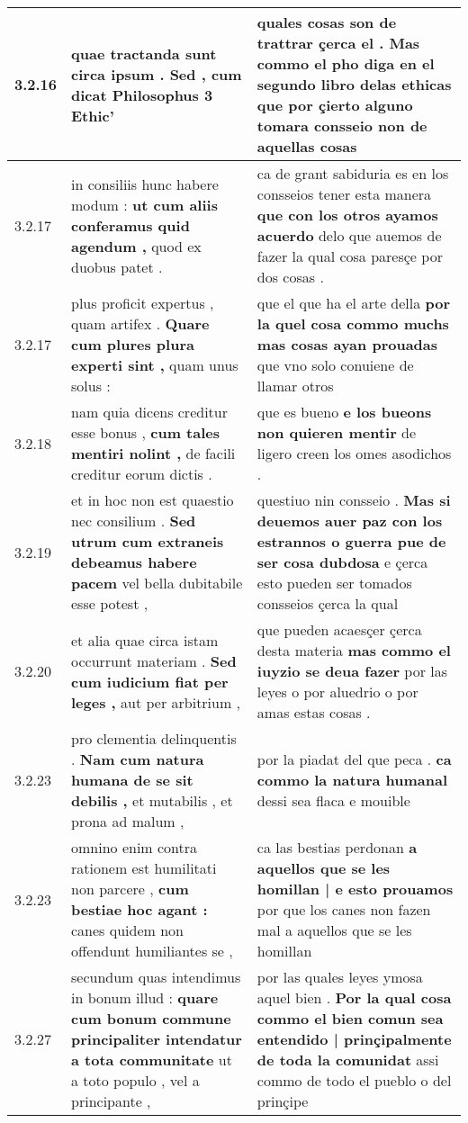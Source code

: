 \begin{tabular}{|p{1cm}|p{6.5cm}|p{6.5cm}|}
3.2.16 & quae tractanda sunt circa ipsum . \textbf{ Sed , cum dicat Philosophus } 3 Ethic’ & quales cosas son de trattrar çerca el . \textbf{ Mas commo el pho diga en el segundo libro delas ethicas } que por çierto alguno tomara consseio non de aquellas cosas \\\hline
3.2.17 & in consiliis hunc habere modum : \textbf{ ut cum aliis conferamus quid agendum , } quod ex duobus patet . & ca de grant sabiduria es en los consseios tener esta manera \textbf{ que con los otros ayamos acuerdo } delo que auemos de fazer la qual cosa paresçe por dos cosas . \\\hline
3.2.17 & plus proficit expertus , quam artifex . \textbf{ Quare cum plures plura experti sint , } quam unus solus : & que el que ha el arte della \textbf{ por la quel cosa commo muchs mas cosas ayan prouadas } que vno solo conuiene de llamar otros \\\hline
3.2.18 & nam quia dicens creditur esse bonus , \textbf{ cum tales mentiri nolint , } de facili creditur eorum dictis . & que es bueno \textbf{ e los bueons non quieren mentir } de ligero creen los omes asodichos . \\\hline
3.2.19 & et in hoc non est quaestio nec consilium . \textbf{ Sed utrum cum extraneis debeamus habere pacem } vel bella dubitabile esse potest , & questiuo nin consseio . \textbf{ Mas si deuemos auer paz con los estrannos o guerra pue de ser cosa dubdosa } e çerca esto pueden ser tomados consseios çerca la qual \\\hline
3.2.20 & et alia quae circa istam occurrunt materiam . \textbf{ Sed cum iudicium fiat per leges , } aut per arbitrium , & que pueden acaesçer çerca desta materia \textbf{ mas commo el iuyzio se deua fazer } por las leyes o por aluedrio o por amas estas cosas . \\\hline
3.2.23 & pro clementia delinquentis . \textbf{ Nam cum natura humana de se sit debilis , } et mutabilis , et prona ad malum , & por la piadat del que peca . \textbf{ ca commo la natura humanal } dessi sea flaca e mouible \\\hline
3.2.23 & omnino enim contra rationem est humilitati non parcere , \textbf{ cum bestiae hoc agant : } canes quidem non offendunt humiliantes se , & ca las bestias perdonan \textbf{ a aquellos que se les homillan | e esto prouamos } por que los canes non fazen mal a aquellos que se les homillan \\\hline
3.2.27 & secundum quas intendimus in bonum illud : \textbf{ quare cum bonum commune principaliter intendatur a tota communitate } ut a toto populo , vel a principante , & por las quales leyes ymosa aquel bien . \textbf{ Por la qual cosa commo el bien comun sea entendido | prinçipalmente de toda la comunidat } assi commo de todo el pueblo o del prinçipe \\\hline

\end{tabular}
